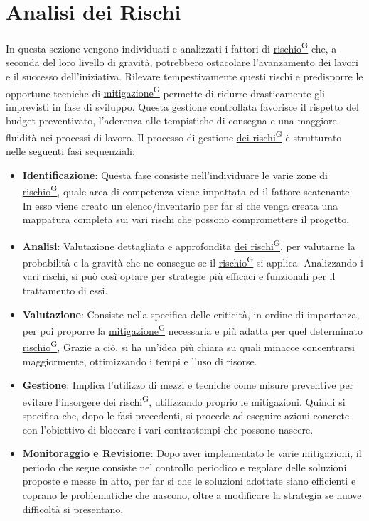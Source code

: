 \documentclass[a4paper,12pt]{article}
\providecommand{\glslink}[2]{\href{https://alittlebyte-19.github.io/Documentazione/glossario.html\#gls-#1}{\underline{#2}\textsuperscript{\scriptsize G}}}
\begin{document}
\section{Analisi dei Rischi}
\label{sec:analisi_dei_rischi}
In questa sezione vengono individuati e analizzati i fattori di \glslink{rischio}{rischio} che, a seconda del loro livello di gravità, potrebbero ostacolare l'avanzamento dei lavori e il successo dell'iniziativa. Rilevare tempestivamente questi rischi e predisporre le opportune tecniche di \glslink{mitigazione-dei-rischi}{mitigazione} permette di ridurre drasticamente gli imprevisti in fase di sviluppo. Questa gestione controllata favorisce il rispetto del budget preventivato, l'aderenza alle tempistiche di consegna e una maggiore fluidità nei processi di lavoro. Il processo di gestione \glslink{mitigazione-dei-rischi}{dei rischi} è strutturato nelle seguenti fasi sequenziali:
\begin{itemize}
    \item \textbf{Identificazione}: Questa fase consiste nell'individuare le varie zone di \glslink{rischio}{rischio}, quale area di competenza viene impattata ed il fattore scatenante.
    In esso viene creato un elenco/inventario per far si che venga creata una mappatura completa sui vari rischi che possono compromettere il progetto.
    \item \textbf{Analisi}: Valutazione dettagliata e approfondita \glslink{mitigazione-dei-rischi}{dei rischi}, per valutarne la probabilità e la gravità che ne consegue se il \glslink{rischio}{rischio} si applica.
    Analizzando i vari rischi, si può così optare per strategie più efficaci e funzionali per il trattamento di essi.
    \item \textbf{Valutazione}: Consiste nella specifica delle criticità, in ordine di importanza, per poi proporre la \glslink{mitigazione-dei-rischi}{mitigazione} necessaria e più adatta per quel determinato \glslink{rischio}{rischio},
    Grazie a ciò, si ha un'idea più chiara su quali minacce concentrarsi maggiormente, ottimizzando i tempi e l'uso di risorse.
    \item \textbf{Gestione}: Implica l'utilizzo di mezzi e tecniche come misure preventive per evitare l'insorgere \glslink{mitigazione-dei-rischi}{dei rischi}, utilizzando proprio le mitigazioni.
    Quindi si specifica che, dopo le fasi precedenti, si procede ad eseguire azioni concrete con l'obiettivo di bloccare i vari contrattempi che possono nascere.
    \item \textbf{Monitoraggio e Revisione}: Dopo aver implementato le varie mitigazioni, il periodo che segue consiste nel controllo periodico e regolare delle soluzioni proposte e messe in atto,
    per far si che le soluzioni adottate siano efficienti e coprano le problematiche che nascono, oltre a modificare la strategia se nuove difficoltà si presentano.
\end{itemize}
\end{document}
